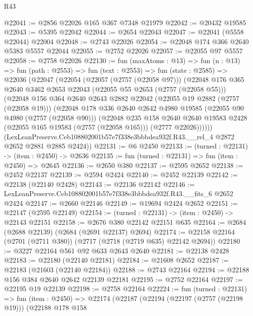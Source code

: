 \begin{lexlean}{R43}
\begin{coremodule}
@22041 := @2856 @22026 @165 @367 @7348 @21979
@22042 := @20432 @19585
@22043 := @5395 @22042
@22044 := @2654 @22043
@22047 := @22041 (@5558 @22044) @22004
@22048 := @2743 @22026
@22054 := @22048 @174 @366 @2640 @5383 @5557 @22044
@22055 := @2752 @22026
@22057 := @22055 @97 @5557
@22058 := @2758 @22026
@22130 := fun (maxAtoms : @13) =>
  fun (n : @13) =>
  fun (path : @2553) =>
  fun (text : @2553) =>
  fun (state : @2585) =>
  @22036
    (@22047
      (@22054
        (@22057 (@2757 (@22058 @97)))
        (@22048
          @176
          @365
          @2640
          @3462
          @2653
          @22043
          (@22055 @55 @2653 (@2757 (@22058 @55)))
          (@22048
            @156
            @364
            @2640
            @2643
            @2882
            @22042
            (@22055 @19 @2882 (@2757 (@22058 @19)))
            (@22048
              @178
              @336
              @2640
              @2642
              @4980
              @19585
              (@22055 @90 @4980 (@2757 (@22058 @90)))
              (@22048
                @235
                @158
                @2640
                @2640
                @19583
                @2428
                (@22055 @165 @19583 (@2757 (@22058 @165)))
                (@2777 @22026))))))
      (LexLeanPreserve.Ceb108802001b57e7f338e3bbbdea932f.R43.__rel_4 @2872 @2652 @2881 @2885 @2424))
@22131 := @6 @2450
@22133 := (turned : @22131) -> (item : @2450) -> @2636
@22135 := fun (turned : @22131) => fun (item : @2450) => @2645
@22136 := @2650 @380
@22137 := @2595 @2652
@22138 := @2452 @22137
@22139 := @2594 @2424
@22140 := @2452 @22139
@22142 := @22138 (@22140 @2428)
@22143 := @22136 @22142
@22146 := LexLeanPreserve.Ceb108802001b57e7f338e3bbbdea932f.R43.__fits_6 @2652 @2424
@22147 := @2660 @22146
@22149 := @19694 @2424 @2652
@22151 := @22147 (@2595 @22149)
@22154 := (turned : @22131) -> (item : @2450) -> @22143 @22151
@22158 := @2676 @380 @22142 @22151 @635
@22164 := @2684 (@2688 @22139) (@2684 (@2691 @22137) @2694)
@22174 := @22158 @22164 (@2701 (@2711 @380)) (@2717 (@2718 (@2719 @635) @22142 @2694))
@22180 := @3227 @22164 @561 @92 @633 @2643 @2640
@22181 := @22138 @2428
@22183 := @22180 (@22140 @22181)
@22184 := @21608 @2652
@22187 := @22183 (@21603 (@22140 @22184))
@22188 := @2743 @22164
@22194 := @22188 @156 @384 @2640 @2642 @22139 @22181
@22195 := @2752 @22164
@22197 := @22195 @19 @22139
@22198 := @2758 @22164
@22224 := fun (turned : @22131) =>
  fun (item : @2450) =>
  @22174
    (@22187
      (@22194
        (@22197 (@2757 (@22198 @19)))
        (@22188
          @178
          @158

\end{coremodule}
\end{lexlean}
